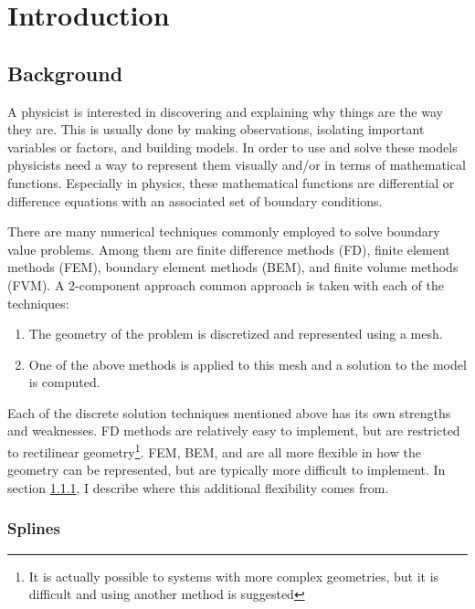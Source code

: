 \section{Introduction} \label{sec:Intro}

  \subsection{Background} \label{ssec:background}

    A physicist is interested in discovering and explaining why things are the way they are. This is usually done by making observations, isolating important variables or factors, and building models. In order to use and solve these models physicists need a way to represent them visually and/or in terms of mathematical functions. Especially in physics, these mathematical functions are differential or difference equations with an associated set of boundary conditions.

    There are many numerical techniques commonly employed to solve boundary value problems. Among them are finite difference methods (FD), finite element methods (FEM), boundary element methods (BEM), and finite volume methods (FVM). A 2-component approach common approach is taken with each of the techniques:

    \begin{enumerate}[1)]
      \item The geometry of the problem is discretized and represented using a mesh.
      \item One of the above methods is applied to this mesh and a solution to the model is computed.
    \end{enumerate}
    \mainstretch

    Each of the discrete solution techniques mentioned above has its own strengths and weaknesses. FD methods are relatively easy to implement, but are restricted to rectilinear geometry\footnote{It is actually possible to systems with more complex geometries, but it is difficult and using another method is suggested}. FEM, BEM, and are all more flexible in how the geometry can be represented, but are typically more difficult to implement. In section \ref{ssub:splines}, I describe where this additional flexibility comes from.

    \subsubsection{Splines} \label{ssub:splines}

